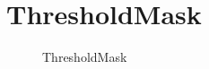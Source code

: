 ﻿




\FloatBarrier
\section{
ThresholdMask
}\label{c000015s000026}


\begin{figure}[htb] %
\marginnote{\setlength\fboxsep{2pt}\fbox{\footnotesize{\kaishu\figurename\,}\footnotesize{\ref{p000042}}}}\centering %
\setlength\fboxsep{0pt} %
\caption{ThresholdMask} %
\label{p000042} %
\end{figure}


